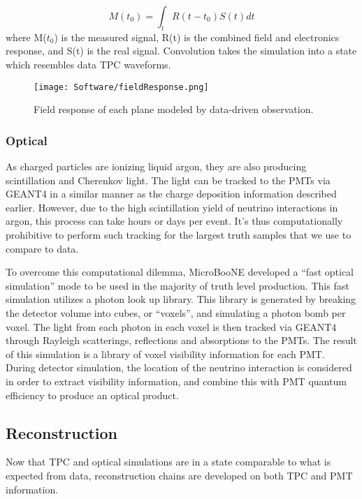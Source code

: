 \begin{equation}
\label{eq:conv}
M(t_0) = \int_{t} R(t - t_0) S(t) dt
\end{equation}
where M($t_0$) is the measured signal, R(t) is the combined field and electronics response, and S(t) is the real signal.  Convolution takes the simulation into a state which resembles data TPC waveforms. 

\begin{figure}[H]
\centering
\texttt{[image: Software/fieldResponse.png]}
\caption{Field response of each plane modeled by data-driven observation. }
\label{fig:fieldResponse}
\end{figure}

\subsubsection{Optical}
As charged particles are ionizing liquid argon, they are also producing scintillation and Cherenkov light. The light can be  tracked to the PMTs via GEANT4 in a similar manner as the charge deposition information described earlier. However, due to the high scintillation yield of neutrino interactions in argon, this process can take hours or days per event. It's thus computationally prohibitive to perform such tracking for the largest truth samples that we use to compare to data.  
\par To overcome this computational dilemma, MicroBooNE developed a “fast optical simulation” mode to be used in the majority of truth level production.  This fast simulation utilizes a photon look up library. This library is generated by breaking the detector volume into cubes, or ``voxels'', and simulating a photon bomb per voxel.  The light from each photon in each voxel is then tracked via GEANT4 through Rayleigh scatterings, reflections and absorptions to the PMTs. The result of this simulation is a library of voxel visibility information for each PMT.  During detector simulation, the location of the neutrino interaction is considered in order to extract visibility information, and combine this with PMT quantum efficiency to produce an optical product.  
 
\subsection{Reconstruction}
\label{sec:reco}
Now that TPC and optical simulations are in a state comparable to what is expected from data, reconstruction chains are developed on both TPC and PMT information. 
